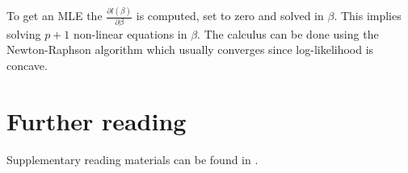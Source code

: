 To get an MLE the $\frac{\partial l\left(\beta\right)}{\partial\beta}$ is computed, set to zero and solved in $\beta$. This implies solving $p+1$ non-linear equations in $\beta$. The calculus can be done using the Newton-Raphson algorithm which usually converges since log-likelihood is concave.

\section*{Further reading}
Supplementary reading materials can be found in \cite{Bramer2016}.


